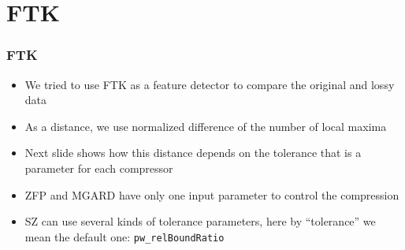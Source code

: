 \section{FTK}

\begin{frame}[fragile]
  \frametitle{FTK}
  \begin{itemize}
  \item We tried to use FTK as a feature detector to compare the original and lossy data
  \item As a distance, we use normalized difference of the number of local maxima
  \item Next slide shows how this distance depends on the tolerance that is a parameter
    for each compressor
  \item ZFP and MGARD have only one input parameter to control the compression
  \item SZ can use several kinds of tolerance parameters, here by ``tolerance'' we mean the default one: \verb|pw_relBoundRatio|
  \end{itemize}
\end{frame}


